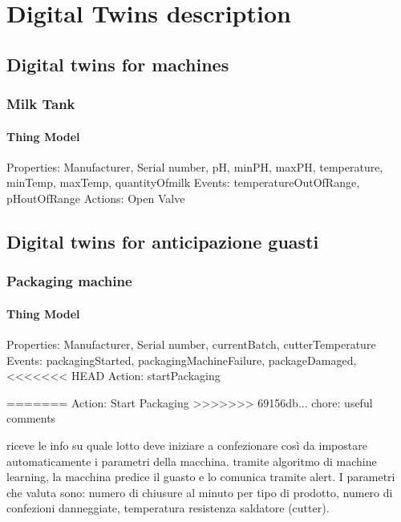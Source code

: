 \chapter{Digital Twins description}

\section{Digital twins for machines}
\subsection{Milk Tank}
\subsubsection{Thing Model}
Properties: Manufacturer, Serial number, pH, minPH, maxPH, temperature, minTemp, maxTemp, quantityOfmilk
Events: temperatureOutOfRange, pHoutOfRange
Actions: Open Valve

\section{Digital twins for anticipazione guasti}
\subsection{Packaging machine}
\subsubsection{Thing Model}
Properties: Manufacturer, Serial number, currentBatch, cutterTemperature
Events: packagingStarted, packagingMachineFailure, packageDamaged,
<<<<<<< HEAD
Action: startPackaging

=======
Action: Start Packaging
>>>>>>> 69156db... chore: useful comments


riceve le info su quale lotto deve iniziare a confezionare così da impostare automaticamente i parametri della macchina.
tramite algoritmo di machine learning, la macchina predice il guasto e lo comunica tramite alert.
I parametri che valuta sono: numero di chiusure al minuto per tipo di prodotto, numero di confezioni danneggiate, temperatura resistenza saldatore (cutter).

